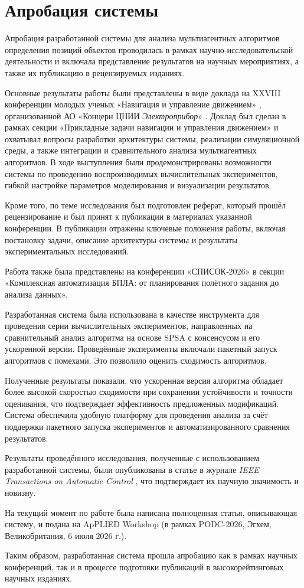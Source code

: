 \section*{Апробация системы}

Апробация разработанной системы для анализа мультиагентных алгоритмов определения позиций объектов проводилась в рамках научно-исследовательской деятельности и включала представление результатов на научных мероприятиях, а также их публикацию в рецензируемых изданиях.

Основные результаты работы были представлены в виде доклада на XXVIII конференции молодых ученых «Навигация и управление движением» \cite{youngSc}, организованной АО «Концерн ЦНИИ \textit{Электроприбор}» \cite{elektropribor}. Доклад был сделан в рамках секции «Прикладные задачи навигации и управления движением» и охватывал вопросы разработки архитектуры системы, реализации симуляционной среды, а также интеграции и сравнительного анализа мультиагентных алгоритмов. В ходе выступления были продемонстрированы возможности системы по проведению воспроизводимых вычислительных экспериментов, гибкой настройке параметров моделирования и визуализации результатов.


Кроме того, по теме исследования был подготовлен реферат, который прошёл рецензирование и был принят к публикации в материалах указанной конференции. В публикации отражены ключевые положения работы, включая постановку задачи, описание архитектуры системы и результаты экспериментальных исследований.

Работа также была представлены на конференции «СПИСОК‑2026» \cite{spisok} в секции «Комплексная автоматизация БПЛА: от планирования полётного задания до анализа данных».


Разработанная система была использована в качестве инструмента для проведения серии вычислительных экспериментов, направленных на сравнительный анализ алгоритма на основе SPSA с консенсусом и его ускоренной версии. Проведённые эксперименты включали пакетный запуск алгоритмов с помехами. Это позволило оценить сходимость алгоритмов.

Полученные результаты показали, что ускоренная версия алгоритма обладает более высокой скоростью сходимости при сохранении устойчивости и точности оценивания, что подтверждает эффективность предложенных модификаций. Система обеспечила удобную платформу для проведения анализа за счёт поддержки пакетного запуска экспериментов и автоматизированного сравнения результатов.

Результаты проведённого исследования, полученные с использованием разработанной системы, были опубликованы в статье в журнале \textit{IEEE Transactions on Automatic Control} \cite{Accelerated_SPSA}, что подтверждает их научную значимость и новизну. 

На текущий момент по работе была написана полноценная статья, описывающая систему, и подана на ApPLIED Workshop \cite{Applied} (в рамках PODC-2026, Эгхем, Великобритания, 6 июля 2026 г.).

Таким образом, разработанная система прошла апробацию как в рамках научных конференций, так и в процессе подготовки публикаций в высокорейтинговых научных изданиях.